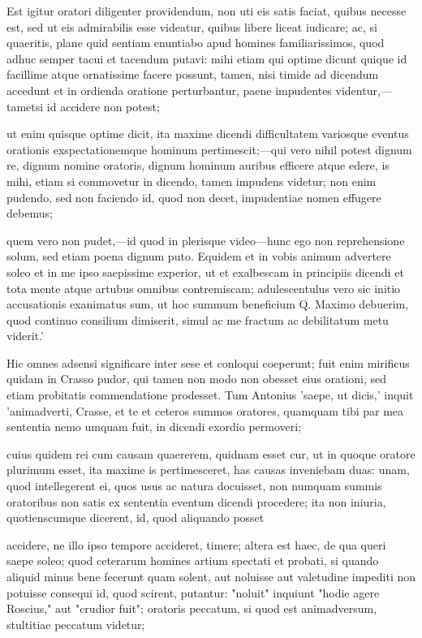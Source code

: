  Est igitur oratori diligenter providendum, non uti eis satis faciat, quibus necesse est, sed ut eis admirabilis esse videatur, quibus libere liceat iudicare; ac, si quaeritis, plane quid sentiam enuntiabo apud homines familiarissimos, quod adhuc semper tacui et tacendum putavi: mihi etiam qui optime dicunt quique id facillime atque ornatissime facere possunt, tamen, nisi timide ad dicendum accedunt et in ordienda oratione perturbantur, paene impudentes videntur,—tametsi id accidere non potest;

 ut enim quisque optime dicit, ita maxime dicendi difficultatem variosque eventus orationis exspectationemque hominum pertimescit;—qui vero nihil potest dignum re, dignum nomine oratoris, dignum hominum auribus efficere atque edere, is mihi, etiam si commovetur in dicendo, tamen impudens videtur; non enim pudendo, sed non faciendo id, quod non decet, impudentiae nomen effugere debemus;

 quem vero non pudet,—id quod in plerisque video—hunc ego non reprehensione solum, sed etiam poena dignum puto. Equidem et in vobis animum advertere soleo et in me ipso saepissime experior, ut et exalbescam in principiis dicendi et tota mente atque artubus omnibus contremiscam; adulescentulus vero sic initio accusationis exanimatus sum, ut hoc summum beneficium Q. Maximo debuerim, quod continuo consilium dimiserit, simul ac me fractum ac debilitatum metu viderit.'

 Hic omnes adsensi significare inter sese et conloqui coeperunt; fuit enim mirificus quidam in Crasso pudor, qui tamen non modo non obesset eius orationi, sed etiam probitatis commendatione prodesset. Tum Antonius 'saepe, ut dicis,' inquit 'animadverti, Crasse, et te et ceteros summos oratores, quamquam tibi par mea sententia nemo umquam fuit, in dicendi exordio permoveri;

 cuius quidem rei cum causam quaererem, quidnam esset cur, ut in quoque oratore plurimum esset, ita maxime is pertimesceret, has causas inveniebam duas: unam, quod intellegerent ei, quos usus ac natura docuisset, non numquam summis oratoribus non satis ex sententia eventum dicendi procedere; ita non iniuria, quotienscumque dicerent, id, quod aliquando posset

 accidere, ne illo ipso tempore accideret, timere; altera est haec, de qua queri saepe soleo; quod ceterarum homines artium spectati et probati, si quando aliquid minus bene fecerunt quam solent, aut noluisse aut valetudine impediti non potuisse consequi id, quod scirent, putantur: "noluit" inquiunt "hodie agere Roscius," aut "crudior fuit"; oratoris peccatum, si quod est animadversum, stultitiae peccatum videtur;

